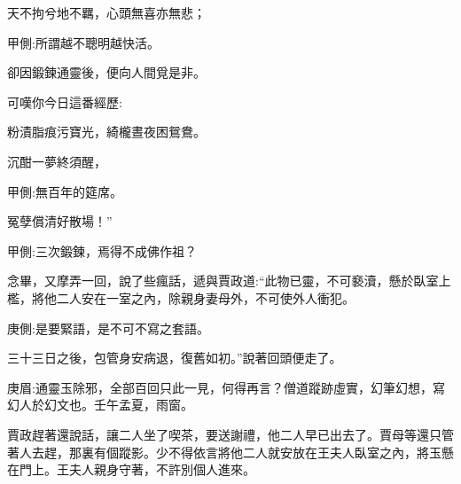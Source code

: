 \begin{poem}
    \begin{pl}   天不拘兮地不羈，心頭無喜亦無悲；\end{pl}
    \begin{note}甲側:所謂越不聰明越快活。\end{note}

    \begin{pl}   卻因鍛鍊通靈後，便向人間覓是非。\end{pl}
\end{poem}


\begin{parag}
    可嘆你今日這番經歷:
\end{parag}


\begin{poem}
    \begin{pl} 粉漬脂痕污寶光，綺櫳晝夜困鴛鴦。\end{pl}

    \begin{pl} 沉酣一夢終須醒，\end{pl}\begin{note}甲側:無百年的筵席。\end{note}\begin{pl}冤孽償清好散場！”\end{pl}\begin{note}甲側:三次鍛鍊，焉得不成佛作祖？\end{note}
\end{poem}


\begin{parag}
    念畢，又摩弄一回，說了些瘋話，遞與賈政道:“此物已靈，不可褻瀆，懸於臥室上檻，將他二人安在一室之內，除親身妻母外，不可使外人衝犯。\begin{note}庚側:是要緊語，是不可不寫之套語。\end{note}三十三日之後，包管身安病退，復舊如初。”說著回頭便走了。\begin{note}庚眉:通靈玉除邪，全部百回只此一見，何得再言？僧道蹤跡虛實，幻筆幻想，寫幻人於幻文也。壬午孟夏，雨窗。\end{note}賈政趕著還說話，讓二人坐了喫茶，要送謝禮，他二人早已出去了。賈母等還只管著人去趕，那裏有個蹤影。少不得依言將他二人就安放在王夫人臥室之內，將玉懸在門上。王夫人親身守著，不許別個人進來。
\end{parag}


